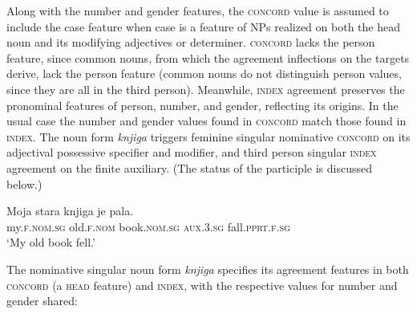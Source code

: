 \documentclass[output=paper
	        ,collection
	        ,collectionchapter
 	        ,biblatex
                ,babelshorthands
                ,newtxmath
                ,draftmode
                ,colorlinks, citecolor=brown
]{langscibook}
\begin{document}
Along with the number and gender features, the \textsc{concord} value is assumed to include the case feature when case is a feature of NPs  realized on both the head noun and its modifying adjectives or determiner.   \textsc{concord} lacks the person feature, since  common nouns, from which the agreement inflections on the targets derive, lack the person feature (common nouns do not distinguish person values, since they are all in the third person).    Meanwhile, \textsc{index} agreement preserves the pronominal features of person, number, and gender, reflecting its origins.  In the usual case the number and gender values found in \textsc{concord} match those found in \textsc{index}.  The  noun form \textit{knjiga} triggers feminine singular nominative \textsc{concord} on its adjectival possessive specifier and modifier, and third person singular \textsc{index} agreement on the finite auxiliary.  (The status of the participle is discussed below.)  

\begin{exe}
\ex  \label{fell}
\gll 	Moja 	stara	 knjiga	je pala.  \\
my.\textsc{f.nom.sg}  old.\textsc{f.nom} 	book.\textsc{nom.sg} 	\textsc{aux.3.sg}  fall.\textsc{pprt.f.sg} \\
\glt`My old book fell.' \citep[18]{Wechsler+Zlatic:2003}
\end{exe}

\noindent
The nominative singular noun form \emph{knjiga} specifies its agreement features in both \textsc{concord} (a \textsc{head} feature) and \textsc{index}, with the respective values for number and gender shared:
\end{document}
